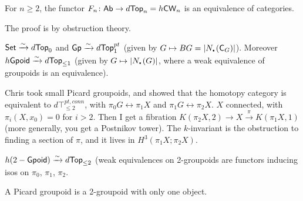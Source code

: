 \begin{theorem}
 For $n\ge 2$, the functor $F_n\colon \text{\sf Ab}\to d\text{\sf Top}_n=h\text{\sf CW}_n$ is an equivalence of categories.
\end{theorem}
The proof is by obstruction theory.
\begin{theorem}
 $\operatorname{\sf Set}\xrightarrow\sim d\text{\sf Top}_0$ and $\text{\sf Gp}\xrightarrow\sim d\text{\sf Top}_1^{pt}$ (given by $G\mapsto BG=|N_\udot(\C_G)|$). Moreover $h\text{\sf Gpoid}\xrightarrow\sim d\text{\sf Top}_{\le 1}$ (given by $G\mapsto |N_\udot(G)|$, where a weak equivalence of groupoids is an equivalence).
\end{theorem}
Chris took small Picard groupoids, and showed that the homotopy category is equivalent to $d\top_{\le 2}^{pt,conn}$, with $\pi_0G\leftrightarrow \pi_1 X$ and $\pi_1 G\leftrightarrow \pi_2 X$. $X$ connected, with $\pi_i(X,x_0)=0$ for $i>2$. Then I get a fibration $K(\pi_2X,2)\to X\xrightarrow{\pi} K(\pi_1 X,1)$ (more generally, you get a Postnikov tower). The $k$-invariant is the obstruction to finding a section of $\pi$, and it lives in $H^3(\pi_1 X;\pi_2 X)$.
\begin{theorem}
 $h(2-\text{\sf Gpoid})\xrightarrow\sim d\text{\sf Top}_{\le 2}$ (weak equivalences on 2-groupoids are functors inducing isos on $\pi_0$, $\pi_1$, $\pi_2$.
\end{theorem}
A Picard groupoid is a 2-groupoid with only one object.







